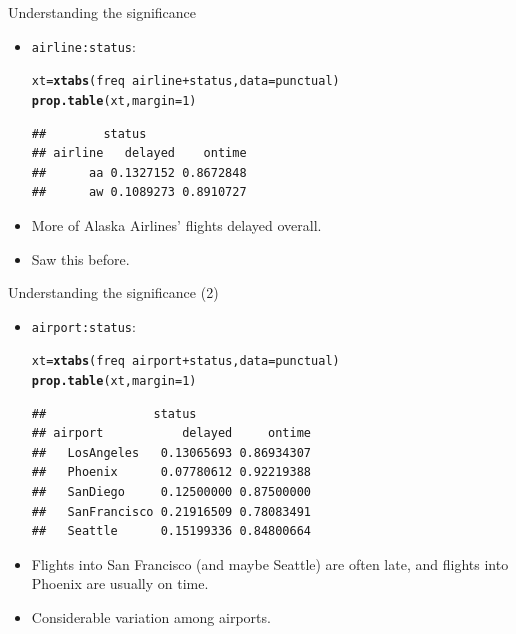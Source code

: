 \documentclass[unknownkeysallowed]{beamer}\usepackage[]{graphicx}\usepackage[]{color}
\makeatletter
\newcommand{\hlnum}[1]{\textcolor[rgb]{0.686,0.059,0.569}{#1}}%
\newcommand{\hlopt}[1]{\textcolor[rgb]{0,0,0}{#1}}%
\newcommand{\hlstd}[1]{\textcolor[rgb]{0.345,0.345,0.345}{#1}}%
\newcommand{\hlkwb}[1]{\textcolor[rgb]{0.69,0.353,0.396}{#1}}%
\newcommand{\hlkwc}[1]{\textcolor[rgb]{0.333,0.667,0.333}{#1}}%
\newcommand{\hlkwd}[1]{\textcolor[rgb]{0.737,0.353,0.396}{\textbf{#1}}}%
\newenvironment{kframe}{%
 \def\at@end@of@kframe{}%
 \ifinner\ifhmode%
  \def\at@end@of@kframe{\end{minipage}}%
  \begin{minipage}{\columnwidth}%
 \fi\fi%
 \def\FrameCommand##1{\hskip\@totalleftmargin \hskip-\fboxsep
 \colorbox{shadecolor}{##1}\hskip-\fboxsep
     \hskip-\linewidth \hskip-\@totalleftmargin \hskip\columnwidth}%
 \MakeFramed {\advance\hsize-\width
   \@totalleftmargin\z@ \linewidth\hsize
   \@setminipage}}%
 {\par\unskip\endMakeFramed%
 \at@end@of@kframe}
\newenvironment{knitrout}{}{} %
\makeatother
\begin{document}
\begin{frame}[fragile]{Understanding the significance}
  
  \begin{itemize}
  \item \texttt{airline:status}:

\begin{knitrout}
\color{fgcolor}\begin{kframe}
\begin{alltt}
\hlstd{xt}\hlkwb{=}\hlkwd{xtabs}\hlstd{(freq}\hlopt{~}\hlstd{airline}\hlopt{+}\hlstd{status,}\hlkwc{data}\hlstd{=punctual)}
\hlkwd{prop.table}\hlstd{(xt,} \hlkwc{margin}\hlstd{=}\hlnum{1}\hlstd{)}
\end{alltt}
\begin{verbatim}
##        status
## airline   delayed    ontime
##      aa 0.1327152 0.8672848
##      aw 0.1089273 0.8910727
\end{verbatim}
\end{kframe}
\end{knitrout}

\item More of Alaska Airlines' flights delayed overall.
\item Saw this before.
  \end{itemize}
  
\end{frame}

\begin{frame}[fragile]{Understanding the significance (2)}
  
  \begin{itemize}
  \item \texttt{airport:status}:
\begin{knitrout}
\color{fgcolor}\begin{kframe}
\begin{alltt}
\hlstd{xt}\hlkwb{=}\hlkwd{xtabs}\hlstd{(freq}\hlopt{~}\hlstd{airport}\hlopt{+}\hlstd{status,}\hlkwc{data}\hlstd{=punctual)}
\hlkwd{prop.table}\hlstd{(xt,}\hlkwc{margin}\hlstd{=}\hlnum{1}\hlstd{)}
\end{alltt}
\begin{verbatim}
##               status
## airport           delayed     ontime
##   LosAngeles   0.13065693 0.86934307
##   Phoenix      0.07780612 0.92219388
##   SanDiego     0.12500000 0.87500000
##   SanFrancisco 0.21916509 0.78083491
##   Seattle      0.15199336 0.84800664
\end{verbatim}
\end{kframe}
\end{knitrout}
\item Flights into San Francisco (and maybe Seattle) are often late, and
  flights into Phoenix are usually on time.
\item Considerable variation among airports.
  \end{itemize}
  
\end{frame}
\end{document}
